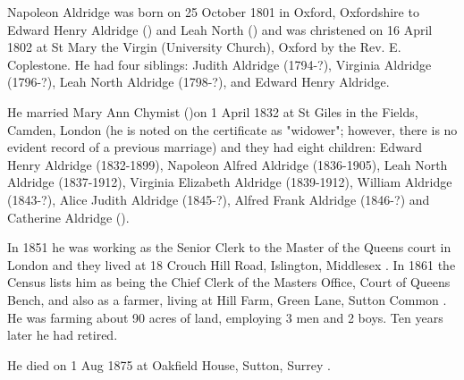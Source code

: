 
Napoleon Aldridge was born on 25 October 1801 in Oxford, Oxfordshire to Edward Henry Aldridge () and Leah North () \cite{NapoleonAldridgeBirth} and was christened on 16 April 1802 at St Mary the Virgin (University Church), Oxford by the Rev. E. Coplestone.  He had four siblings:  Judith Aldridge (1794-?), Virginia Aldridge (1796-?), Leah North Aldridge (1798-?), and Edward Henry Aldridge.

He married Mary Ann Chymist ()on 1 April 1832 at St Giles in the Fields, Camden, London \cite{NapoleonAldridgeMarriage}  (he is noted on the certificate as "widower"; however, there is no evident record of a previous marriage) and they had eight children:  Edward Henry Aldridge (1832-1899),  Napoleon Alfred Aldridge (1836-1905), Leah North Aldridge (1837-1912), Virginia Elizabeth Aldridge (1839-1912), William Aldridge (1843-?), Alice Judith Aldridge (1845-?), Alfred Frank Aldridge (1846-?) and Catherine Aldridge ().

In 1851 he was working as the Senior Clerk to the Master of the Queens court in London and they lived at 18 Crouch Hill Road, Islington, Middlesex \cite{NapoleonAldridgeOccupation}.  In 1861 the Census lists him as being the Chief Clerk of the Masters Office, Court of Queens Bench, and also as a farmer, living at Hill Farm, Green Lane, Sutton Common \cite{NapoleonAldridgeResidence}.  He was farming about 90 acres of land, employing 3 men and 2 boys.  Ten years later he had retired.
	
He died on 1 Aug 1875 at Oakfield House, Sutton, Surrey \cite{NapoleonAldridgeDeath}.

